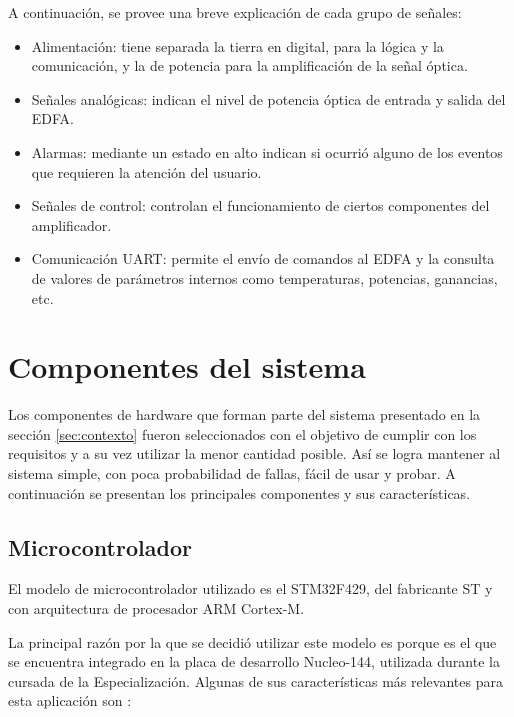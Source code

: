 A continuación, se provee una breve explicación de cada grupo de señales:
\begin{itemize}
\item Alimentación: tiene separada la tierra en digital, para la lógica y la comunicación, y la de potencia para la amplificación de la señal óptica.
\item Señales analógicas: indican el nivel de potencia óptica de entrada y salida del EDFA.
\item Alarmas: mediante un estado en alto indican si ocurrió alguno de los eventos que requieren la atención del usuario.
\item Señales de control: controlan el funcionamiento de ciertos componentes del amplificador.
\item Comunicación UART: permite el envío de comandos al EDFA y la consulta de valores de parámetros internos como temperaturas, potencias, ganancias, etc.
\end{itemize}

\section{Componentes del sistema}

Los componentes de hardware que forman parte del sistema presentado en la sección \ref{sec:contexto} fueron seleccionados con el objetivo de cumplir con los requisitos y a su vez utilizar la menor cantidad posible. Así se logra mantener al sistema simple, con poca probabilidad de fallas, fácil de usar y probar. A continuación se presentan los principales componentes y sus características.

\subsection{Microcontrolador}

El modelo de microcontrolador utilizado es el STM32F429, del fabricante ST y con arquitectura de procesador ARM Cortex-M.

La principal razón por la que se decidió utilizar este modelo es porque es el que se encuentra integrado en la placa de desarrollo Nucleo-144, utilizada durante la cursada de la Especialización. Algunas de sus características más relevantes para esta aplicación son \citep{STM32F429}:

